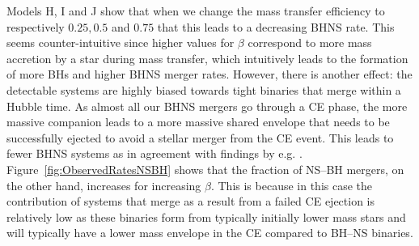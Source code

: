 \documentclass[twocolumn]{aastex63}
\newcommand{\floor}[1]{\textbf{\textcolor{magenta}{[Floor: #1]}}}
\newcommand\bhnsSingle{BHNS\xspace}
\begin{document}
%  
% 
Models H, I and J show that when we change  the mass transfer efficiency  to respectively $0.25, 0.5 $ and $0.75$ that this leads to a decreasing \bhnsSingle rate.  This seems counter-intuitive since higher values for $\beta$ correspond to more mass accretion by a star during mass transfer, which intuitively leads to the formation of more \acp{BH} and higher \bhnsSingle merger rates. However, there is another effect: the detectable  systems are highly biased towards tight binaries that merge within a Hubble time. As almost all our \bhnsSingle mergers go through a \ac{CE} phase, the more massive companion leads to a more massive shared envelope  that needs to be successfully ejected to avoid a stellar merger from the \ac{CE} event. This leads to  fewer \bhnsSingle systems as in agreement with findings by e.g.  \citet{kruckow2018progenitors}.  Figure~\ref{fig:ObservedRatesNSBH} shows that the fraction of  NS--BH mergers, on the other hand, increases for increasing $\beta$. This is because in this case the contribution of systems that merge as a result from a failed  \ac{CE} ejection is relatively low as these binaries form from typically initially lower mass stars and  will typically have a lower mass envelope in the \ac{CE} compared to BH--NS binaries. 


%
%
\end{document}

